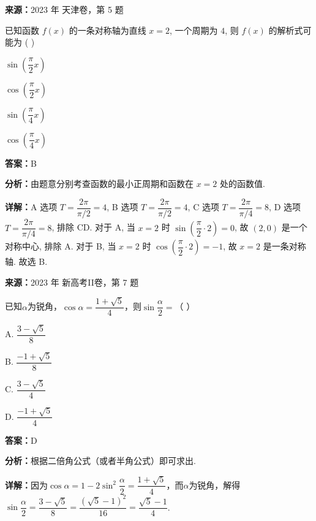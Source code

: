 \begin{question}[points=5]
\textbf{来源：}2023 年 天津卷，第 5 题\par
已知函数 $f(x)$ 的一条对称轴为直线 $x = 2$, 一个周期为 $4$, 则 $f(x)$ 的解析式可能为 ( )
\begin{choices}
  \item $\sin\left(\dfrac{\pi}{2}x\right)$
  \item $\cos\left(\dfrac{\pi}{2}x\right)$
  \item $\sin\left(\dfrac{\pi}{4}x\right)$
  \item $\cos\left(\dfrac{\pi}{4}x\right)$
\end{choices}
\begin{solution}
\textbf{答案：}B

\textbf{分析：}由题意分别考查函数的最小正周期和函数在 $x=2$ 处的函数值.

\textbf{详解：}A 选项 $T = \dfrac{2\pi}{\pi/2} = 4$, B 选项 $T = \dfrac{2\pi}{\pi/2} = 4$, C 选项 $T = \dfrac{2\pi}{\pi/4} = 8$, D 选项 $T = \dfrac{2\pi}{\pi/4} = 8$, 排除 CD. 对于 A, 当 $x=2$ 时 $\sin\left(\dfrac{\pi}{2}\cdot 2\right)=0$, 故 $(2,0)$ 是一个对称中心, 排除 A. 对于 B, 当 $x=2$ 时 $\cos\left(\dfrac{\pi}{2}\cdot 2\right) = -1$, 故 $x=2$ 是一条对称轴. 故选 B.
\end{solution}
\end{question}

\begin{question}[points=5]
\textbf{来源：}2023 年 新高考II卷，第 7 题\par
已知$\alpha$为锐角，$\cos\alpha=\dfrac{1+\sqrt{5}}{4}$，则$\sin\dfrac{\alpha}{2}=$（ \quad ）
\begin{choices}
  \item A. $\dfrac{3-\sqrt{5}}{8}$
  \item B. $\dfrac{-1+\sqrt{5}}{8}$
  \item C. $\dfrac{3-\sqrt{5}}{4}$
  \item D. $\dfrac{-1+\sqrt{5}}{4}$
\end{choices}
\begin{solution}
\textbf{答案：}D

\textbf{分析：}根据二倍角公式（或者半角公式）即可求出.

\textbf{详解：}因为$\cos\alpha=1-2\sin^{2}\dfrac{\alpha}{2}=\dfrac{1+\sqrt{5}}{4}$，而$\alpha$为锐角，解得$\sin\dfrac{\alpha}{2}=\dfrac{3-\sqrt{5}}{8}=\dfrac{(\sqrt{5}-1)^{2}}{16}=\dfrac{\sqrt{5}-1}{4}$.
\end{solution}
\end{question}

